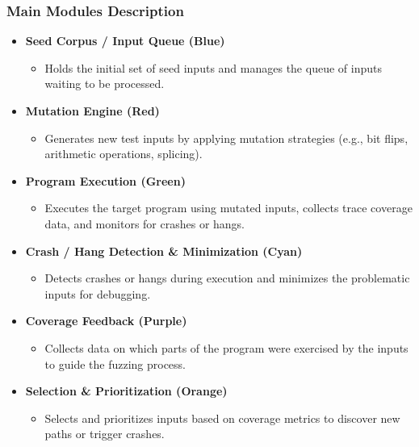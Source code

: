 \documentclass{beamer}
\begin{document}
\begin{frame}
\frametitle{Main Modules Description}
 
\begin{itemize}
    \item \textbf{Seed Corpus / Input Queue (Blue)}
    \begin{itemize}
        \item Holds the initial set of seed inputs and manages the queue of inputs waiting to be processed.
    \end{itemize}
    
    \item \textbf{Mutation Engine (Red)}
    \begin{itemize}
        \item Generates new test inputs by applying mutation strategies (e.g., bit flips, arithmetic operations, splicing).
    \end{itemize}
    
    \item \textbf{Program Execution (Green)}
    \begin{itemize}
        \item Executes the target program using mutated inputs, collects trace coverage data, and monitors for crashes or hangs.
    \end{itemize}
    
    \item \textbf{Crash / Hang Detection \& Minimization (Cyan)}
    \begin{itemize}
        \item Detects crashes or hangs during execution and minimizes the problematic inputs for debugging.
    \end{itemize}
    
    \item \textbf{Coverage Feedback (Purple)}
    \begin{itemize}
        \item Collects data on which parts of the program were exercised by the inputs to guide the fuzzing process.
    \end{itemize}
    
    \item \textbf{Selection \& Prioritization (Orange)}
    \begin{itemize}
        \item Selects and prioritizes inputs based on coverage metrics to discover new paths or trigger crashes.
    \end{itemize}
\end{itemize}
 
\end{frame}
 
\end{document}
